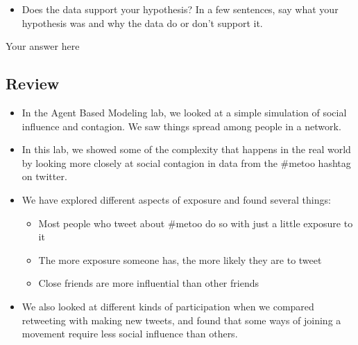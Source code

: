 \documentclass[11pt]{article}
\providecommand{\tightlist}{%
      \setlength{\itemsep}{0pt}\setlength{\parskip}{0pt}}
\begin{document}
\begin{itemize}
\tightlist
\item
  Does the data support your hypothesis? In a few sentences, say what
  your hypothesis was and why the data do or don't support it.
\end{itemize}

    Your answer here

    \hypertarget{review}{%
\subsection{Review}\label{review}}

\begin{itemize}
\tightlist
\item
  In the Agent Based Modeling lab, we looked at a simple simulation of
  social influence and contagion. We saw things spread among people in a
  network.
\item
  In this lab, we showed some of the complexity that happens in the real
  world by looking more closely at social contagion in data from the
  \#metoo hashtag on twitter.
\item
  We have explored different aspects of exposure and found several
  things:

  \begin{itemize}
  \tightlist
  \item
    Most people who tweet about \#metoo do so with just a little
    exposure to it
  \item
    The more exposure someone has, the more likely they are to tweet
  \item
    Close friends are more influential than other friends
  \end{itemize}
\item
  We also looked at different kinds of participation when we compared
  retweeting with making new tweets, and found that some ways of joining
  a movement require less social influence than others.
\end{itemize}


    
    
    
    
\end{document}
